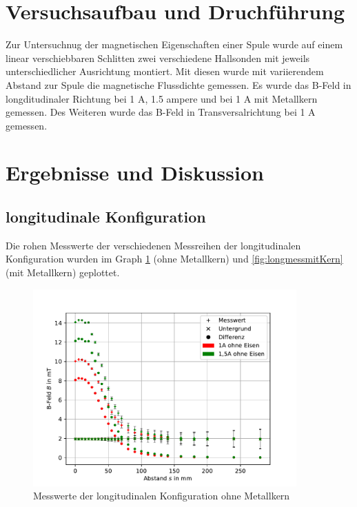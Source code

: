 \documentclass[11pt, a4paper]{article}
\begin{document}
    \section{Versuchsaufbau und Druchführung}
    Zur Untersuchnug der magnetischen Eigenschaften einer Spule wurde auf einem linear verschiebbaren Schlitten zwei verschiedene Hallsonden mit jeweils unterschiedlicher Ausrichtung montiert.
    Mit diesen wurde mit variierendem Abstand zur Spule die magnetische Flussdichte gemessen. Es wurde das B-Feld in longditudinaler Richtung bei 1 \si{\ampere}, 1.5 \si{ampere} und bei 1 \si{\ampere} mit Metallkern gemessen.
    Des Weiteren wurde das B-Feld in Transversalrichtung bei 1 \si{\ampere} gemessen.
    \section{Ergebnisse und Diskussion}
    \subsection{longitudinale Konfiguration}
    Die rohen Messwerte der verschiedenen Messreihen der longitudinalen Konfiguration wurden im Graph \ref{fig:longmessohneKern} (ohne Metallkern) und \ref{fig:longmessmitKern} (mit Metallkern) geplottet.
    \begin{figure}[h]
        \centering
        \includegraphics[width=0.9\textwidth]{ohneKernRaw.pdf}
        \caption{Messwerte der longitudinalen Konfiguration ohne Metallkern}
        \label{fig:longmessohneKern}
    \end{figure}
\end{document}
